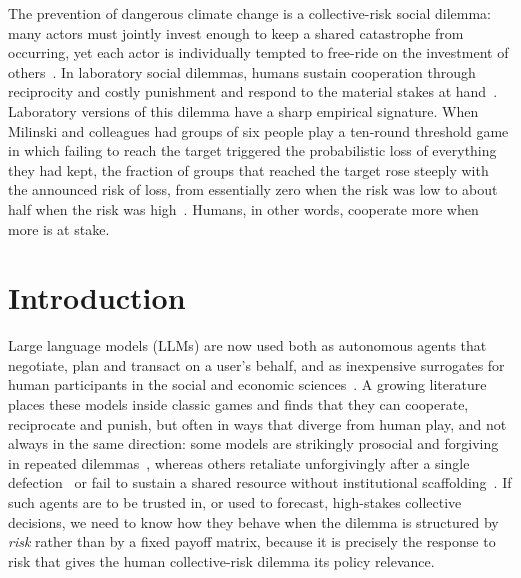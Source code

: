 \documentclass[openacc]{rsproca_new}
\begin{document}
\begin{fmtext}
The prevention of dangerous climate change is a collective-risk social dilemma: many actors must jointly invest enough to keep a shared catastrophe from occurring, yet each actor is individually tempted to free-ride on the investment of others~\cite{milinski2008collective,hardin1968tragedy,dawes1980social}. In laboratory social dilemmas, humans sustain cooperation through reciprocity and costly punishment and respond to the material stakes at hand~\cite{fehr2002altruistic}. Laboratory versions of this dilemma have a sharp empirical signature. When Milinski and colleagues had groups of six people play a ten-round threshold game in which failing to reach the target triggered the probabilistic loss of everything they had kept, the fraction of groups that reached the target rose steeply with the announced risk of loss, from essentially zero when the risk was low to about half when the risk was high~\cite{milinski2008collective}. Humans, in other words, cooperate more when more is at stake.
\end{fmtext}

\maketitle

\section{Introduction}

Large language models (LLMs) are now used both as autonomous agents that negotiate, plan and transact on a user's behalf, and as inexpensive surrogates for human participants in the social and economic sciences~\cite{horton2023large,argyle2023out,aher2023using}. A growing literature places these models inside classic games and finds that they can cooperate, reciprocate and punish, but often in ways that diverge from human play, and not always in the same direction: some models are strikingly prosocial and forgiving in repeated dilemmas~\cite{fontana2024nicer,phelps2023investigating}, whereas others retaliate unforgivingly after a single defection~\cite{akata2023playing} or fail to sustain a shared resource without institutional scaffolding~\cite{piatti2024cooperate}. If such agents are to be trusted in, or used to forecast, high-stakes collective decisions, we need to know how they behave when the dilemma is structured by \emph{risk} rather than by a fixed payoff matrix, because it is precisely the response to risk that gives the human collective-risk dilemma its policy relevance.
\end{document}
